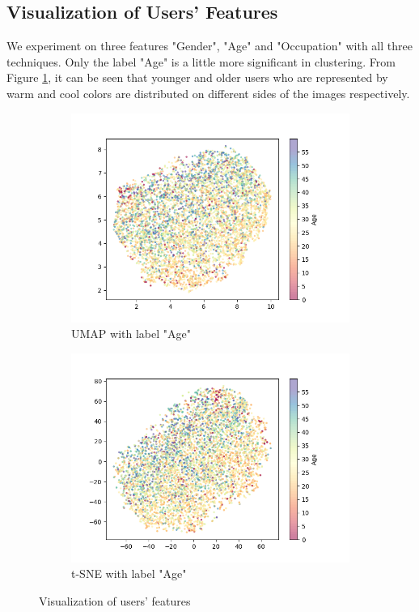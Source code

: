 \documentclass{article}
\begin{document}
\subsection{Visualization of Users' Features}
We experiment on three features "Gender", "Age" and "Occupation" with all three techniques. Only the label "Age" is a little more significant in clustering. From Figure \ref{fig:1}, it can be seen that younger and older users who are represented by warm and cool colors are distributed on different sides of the images respectively.
\begin{figure}[!ht]
    \centering
    \begin{subfigure}{0.49\textwidth}
        \includegraphics[width=\textwidth]{fig/umap_age.png}
        \caption{UMAP with label "Age"}
    \end{subfigure}
    \begin{subfigure}{0.49\textwidth}
        \includegraphics[width=\textwidth]{fig/tsne_age.png}
        \caption{t-SNE with label "Age"}
    \end{subfigure}
    \caption{Visualization of users' features}
    \label{fig:1}
\end{figure}
\end{document}
